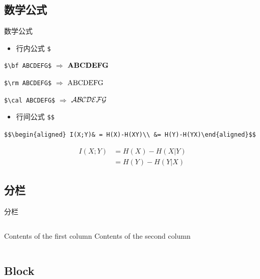 \documentclass[10pt,ignorenonframetext,aspectratio=169,t,]{beamer} %
\providecommand{\tightlist}{%
  \setlength{\itemsep}{0pt}\setlength{\parskip}{0pt}}
\begin{document}
\subsection{数学公式}

\begin{frame}[fragile]{数学公式}

\begin{itemize}
\tightlist
\item
  行内公式 \texttt{\$}
\end{itemize}

\texttt{\$\textbackslash{}bf\ ABCDEFG\$} \(\Rightarrow\) \(\bf ABCDEFG\)

\texttt{\$\textbackslash{}rm\ ABCDEFG\$} \(\Rightarrow\) \(\rm ABCDEFG\)

\texttt{\$\textbackslash{}cal\ ABCDEFG\$} \(\Rightarrow\)
\(\cal ABCDEFG\)

\begin{itemize}
\tightlist
\item
  行间公式 \texttt{\$\$}
\end{itemize}

\texttt{\$\$\textbackslash{}begin\{aligned\}\ I(X;Y)\&\ =\ H(X)-H(X\textbar{}Y)\textbackslash{}\textbackslash{}\ \&=\ H(Y)-H(Y\textbar{}X)\textbackslash{}end\{aligned\}\$\$}

\[\begin{aligned} I(X;Y)& = H(X)-H(X|Y)\\
&= H(Y)-H(Y|X)\end{aligned}\]

\end{frame}

\subsection{分栏}

\begin{frame}{分栏}

\begin{columns}[c] %
Contents of the first column
Contents of the second column
\end{columns}

\end{frame}

\subsection{Block}\label{block}
\end{document}
